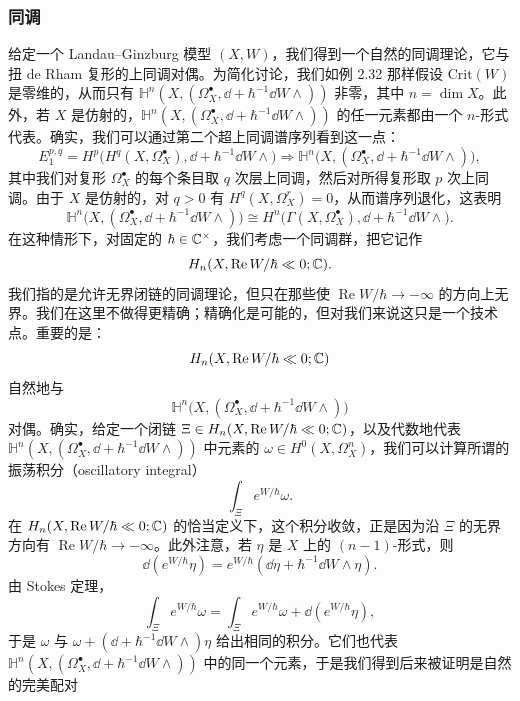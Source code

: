 \subsubsection{同调}
给定一个 Landau–Ginzburg 模型 $(X,W)$，我们得到一个自然的同调理论，它与扭 de Rham 复形的上同调对偶。为简化讨论，我们如例 2.32 那样假设 $\mathrm{Crit}(W)$ 是零维的，从而只有 $\mathbb{H}^n(X,(\Omega^\bullet_X,\dd+\hbar^{-1}\dd W\wedge))$ 非零，其中 $n=\dim X$。此外，若 $X$ 是仿射的，$\mathbb{H}^n(X,(\Omega^\bullet_X,\dd+\hbar^{-1}\dd W\wedge))$ 的任一元素都由一个 $n$-形式代表。确实，我们可以通过第二个超上同调谱序列看到这一点：
\[
E_1^{p,q}=H^p\bigl(H^q(X,\Omega^\bullet_X),\dd+\hbar^{-1}\dd W\wedge\bigr)\Rightarrow\mathbb{H}^n\bigl(X,(\Omega^\bullet_X,\dd+\hbar^{-1}\dd W\wedge)\bigr),
\]
其中我们对复形 $\Omega^\bullet_X$ 的每个条目取 $q$ 次层上同调，然后对所得复形取 $p$ 次上同调。由于 $X$ 是仿射的，对 $q>0$ 有 $H^q(X,\Omega^r_X)=0$，从而谱序列退化，这表明
\[
\mathbb{H}^n\bigl(X,(\Omega^\bullet_X,\dd+\hbar^{-1}\dd W\wedge)\bigr)\cong H^n\bigl(\Gamma(X,\Omega^\bullet_X),\dd+\hbar^{-1}\dd W\wedge\bigr).
\]
在这种情形下，对固定的 $\hbar\in\mathbb{C}^\times$，我们考虑一个同调群，把它记作
\[
H_n(X,\operatorname{Re}W/\hbar\ll0;\mathbb{C}).
\]
我们指的是允许无界闭链的同调理论，但只在那些使 $\operatorname{Re}W/\hbar\to-\infty$ 的方向上无界。我们在这里不做得更精确；精确化是可能的，但对我们来说这只是一个技术点。重要的是：
\[
H_n(X,\operatorname{Re}W/\hbar\ll0;\mathbb{C})
\]
自然地与
\[
\mathbb{H}^n\bigl(X,(\Omega^\bullet_X,\dd+\hbar^{-1}\dd W\wedge)\bigr)
\]
对偶。确实，给定一个闭链 $\Xi\in H_n(X,\operatorname{Re}W/\hbar\ll0;\mathbb{C})$，以及代数地代表 $\mathbb{H}^n(X,(\Omega^\bullet_X,\dd+\hbar^{-1}\dd W\wedge))$ 中元素的 $\omega\in H^0(X,\Omega^n_X)$，我们可以计算所谓的振荡积分（oscillatory integral）
\[
\int_\Xi e^{W/\hbar}\omega.
\]
在 $H_n(X,\operatorname{Re}W/\hbar\ll0;\mathbb{C})$ 的恰当定义下，这个积分收敛，正是因为沿 $\Xi$ 的无界方向有 $\operatorname{Re}W/\hbar\to-\infty$。此外注意，若 $\eta$ 是 $X$ 上的 $(n-1)$-形式，则
\[
\dd(e^{W/\hbar}\eta)=e^{W/\hbar}(\dd\eta+\hbar^{-1}\dd W\wedge\eta).
\]
由 Stokes 定理，
\[
\int_\Xi e^{W/\hbar}\omega=\int_\Xi e^{W/\hbar}\omega+\dd(e^{W/\hbar}\eta),
\]
于是 $\omega$ 与 $\omega+(\dd+\hbar^{-1}\dd W\wedge)\eta$ 给出相同的积分。它们也代表 $\mathbb{H}^n(X,(\Omega^\bullet_X,\dd+\hbar^{-1}\dd W\wedge))$ 中的同一个元素，于是我们得到后来被证明是自然的完美配对
